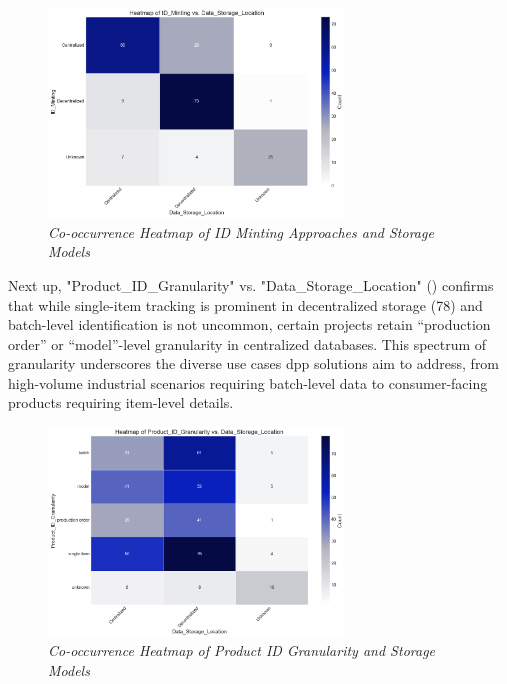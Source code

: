 \begin{figure}[htbp]
  \centering
  \includegraphics[width=0.7\textwidth]{figures/initiatives_minting_vs_storage.png}
  \caption{%
    \textit{Co-occurrence Heatmap of ID Minting Approaches and Storage Models} 
  }
  \label{fig:initiatives_minting_vs_storage}
\end{figure}

Next up, "Product\_ID\_Granularity" vs. "Data\_Storage\_Location" () confirms that while single-item tracking is prominent in decentralized storage (78) and batch-level identification is not uncommon, certain projects retain “production order” or “model”-level granularity in centralized databases. This spectrum of granularity underscores the diverse use cases \ac{dpp} solutions aim to address, from high-volume industrial scenarios requiring batch-level data to consumer-facing products requiring item-level details.

\begin{figure}[htbp]
  \centering
  \includegraphics[width=0.7\textwidth]{figures/initiatives_granularity_vs_storage.png}
  \caption{%
    \textit{Co-occurrence Heatmap of Product ID Granularity and Storage Models} 
  }
  \label{fig:initiatives_granularity_vs_storage}
\end{figure}


